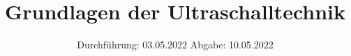 

\subject{VERSUCH US1}
\title{Grundlagen der Ultraschalltechnik}
\date{%
  Durchführung: 03.05.2022
  \hspace{3em}
  Abgabe: 10.05.2022
}



\maketitle
\thispagestyle{empty}
\tableofcontents
\newpage







\printbibliography{}


